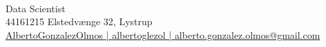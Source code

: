 
\author{\textcolor{\primaryColorToUse}{Alberto 
 }\textcolor{\secondaryColorToUse}{ 
 Gonz\'alez Olmos}} %
\def\phone{ 44161215 }
\def\city{ Elstedvænge 32, Lystrup}
\def\github{ AlbertoGonzalezOlmos | } %
\def\LinkedIn{ albertoglezol | } %
\def\email{alberto.gonzalez.olmos@gmail.com}
\def\role{Data Scientist} %


\begin{center}
	\begin{minipage}[b]{1\textwidth}
	\makeatletter
	\centering {\huge \@author} \\
	\makeatother
    \vspace{1.5em}
    {\Large{\role}} \\
	\vspace{1em}
	{\faMobile*}{\phone}%
	{\faMapMarker*}{\small \city} \\ %
	\href{https://github.com/\github}{\faGithub \github}%
	\href{https://www.linkedin.com/in/\LinkedIn}{\faLinkedin   \LinkedIn} %
	\href{mailto:\email}{ \email}  %
	\end{minipage}
\end{center}


